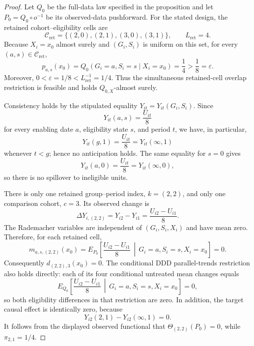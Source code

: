 \documentclass{article}
\begin{document}
\begin{proof}
Let \(Q_0\) be the full-data law specified in the proposition and let \(P_0=Q_0\circ o^{-1}\) be its observed-data pushforward. For the stated design, the retained cohort--eligibility cells are
\[
\mathcal C_{\mathrm{ret}}=\{(2,0),(2,1),(3,0),(3,1)\},
\qquad L_{\mathrm{ret}}=4.
\]
Because \(X_i=x_0\) almost surely and \((G_i,S_i)\) is uniform on this set, for every \((a,s)\in\mathcal C_{\mathrm{ret}}\),
\[
p_{a,s}(x_0)=Q_0(G_i=a,S_i=s\mid X_i=x_0)=\frac14>\frac18=\varepsilon.
\]
Moreover, \(0<\varepsilon=1/8<L_{\mathrm{ret}}^{-1}=1/4\). Thus the simultaneous retained-cell overlap restriction is feasible and holds \(Q_{0,X}\)-almost surely.

Consistency holds by the stipulated equality \(Y_{it}=Y_{it}(G_i,S_i)\). Since
\[
Y_{it}(a,s)=\frac{U_{it}}8
\]
for every enabling date \(a\), eligibility state \(s\), and period \(t\), we have, in particular,
\[
Y_{it}(g,1)=\frac{U_{it}}8=Y_{it}(\infty,1)
\]
whenever \(t<g\); hence no anticipation holds. The same equality for \(s=0\) gives
\[
Y_{it}(a,0)=\frac{U_{it}}8=Y_{it}(\infty,0),
\]
so there is no spillover to ineligible units.

There is only one retained group--period index, \(k=(2,2)\), and only one comparison cohort, \(c=3\). Its observed change is
\[
\Delta Y_{i,(2,2)}=Y_{i2}-Y_{i1}=\frac{U_{i2}-U_{i1}}8.
\]
The Rademacher variables are independent of \((G_i,S_i,X_i)\) and have mean zero. Therefore, for each retained cell,
\[
m_{a,s,(2,2)}(x_0)
=E_{P_0}\!\left[\frac{U_{i2}-U_{i1}}8\,\middle|\,G_i=a,S_i=s,X_i=x_0\right]
=0.
\]
Consequently \(d_{(2,2),3}(x_0)=0\). The conditional DDD parallel-trends restriction also holds directly: each of its four conditional untreated mean changes equals
\[
E_{Q_0}\!\left[\frac{U_{i2}-U_{i1}}8\,\middle|\,G_i=a,S_i=s,X_i=x_0\right]=0,
\]
so both eligibility differences in that restriction are zero. In addition, the target causal effect is identically zero, because
\[
Y_{i2}(2,1)-Y_{i2}(\infty,1)=0.
\]
It follows from the displayed observed functional that \(\Theta_{(2,2)}(P_0)=0\), while \(\pi_{2,1}=1/4\).


\end{proof}
\end{document}
